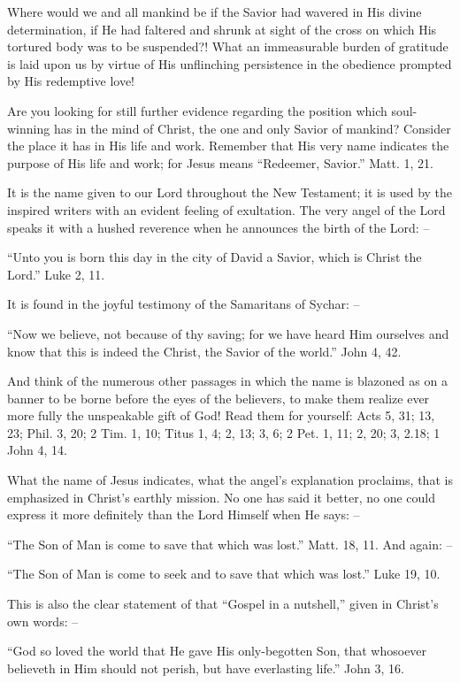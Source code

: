 \documentclass[
]{book}
\begin{document}
Where would we and all mankind be if the Savior had wavered in His divine determination, if He had faltered and shrunk at sight of the cross on which His tortured body was to be suspended?! What an immeasurable burden of gratitude is laid upon us by virtue of His unflinching persistence in the obedience prompted by His redemptive love!

Are you looking for still further evidence regarding the position which soul-winning has in the mind of Christ, the one and only Savior of mankind? Consider the place it has in His life and work. Remember that His very name indicates the purpose of His life and work; for Jesus means ``Redeemer, Savior.'' Matt. 1, 21.

It is the name given to our Lord throughout the New Testament; it is used by the inspired writers with an evident feeling of exultation. The very angel of the Lord speaks it with a hushed reverence when he announces the birth of the Lord: --

``Unto you is born this day in the city of David a Savior, which is Christ the Lord.'' Luke 2, 11.

It is found in the joyful testimony of the Samaritans of Sychar: --

``Now we believe, not because of thy saving; for we have heard Him ourselves and know that this is indeed the Christ, the Savior of the world.'' John 4, 42.

And think of the numerous other passages in which the name is blazoned as on a banner to be borne before the eyes of the believers, to make them realize ever more fully the unspeakable gift of God! Read them for yourself: Acts 5, 31; 13, 23; Phil. 3, 20; 2 Tim. 1, 10; Titus 1, 4; 2, 13; 3, 6; 2 Pet. 1, 11; 2, 20; 3, 2.18; 1 John 4, 14.

What the name of Jesus indicates, what the angel's explanation proclaims, that is emphasized in Christ's earthly mission. No one has said it better, no one could express it more definitely than the Lord Himself when He says: --

``The Son of Man is come to save that which was lost.'' Matt. 18, 11. And again: --

``The Son of Man is come to seek and to save that which was lost.'' Luke 19, 10.

This is also the clear statement of that ``Gospel in a nutshell,'' given in Christ's own words: --

``God so loved the world that He gave His only-begotten Son, that whosoever believeth in Him should not perish, but have everlasting life.'' John 3, 16.
\end{document}
